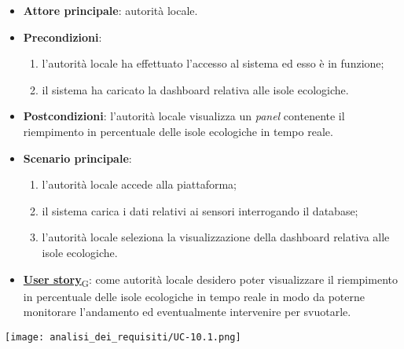 \begin{itemize}
	\item \textbf{Attore principale}: autorità locale.
	\item \textbf{Precondizioni}:
	      \begin{enumerate}
		      \item l'autorità locale ha effettuato l'accesso al sistema ed esso è in funzione;
		      \item il sistema ha caricato la dashboard relativa alle isole ecologiche.
	      \end{enumerate}
	\item \textbf{Postcondizioni}: l'autorità locale visualizza un \textit{panel} contenente il riempimento in percentuale delle isole ecologiche in tempo reale.
	\item \textbf{Scenario principale}:
	      \begin{enumerate}
		      \item l'autorità locale accede alla piattaforma;
		      \item il sistema carica i dati relativi ai sensori interrogando il database;
		      \item l'autorità locale seleziona la visualizzazione della dashboard relativa alle isole ecologiche.
	      \end{enumerate}
	\item \href{https://7last.github.io/docs/rtb/documentazione-interna/glossario\#user-story}{\textbf{User story}\textsubscript{G}}:
	      come autorità locale desidero poter visualizzare il riempimento in percentuale delle isole ecologiche in tempo reale in modo da poterne monitorare l'andamento
	      ed eventualmente intervenire per svuotarle.
\end{itemize}
\begin{center}
	\texttt{[image: analisi\_dei\_requisiti/UC-10.1.png]}
\end{center}


